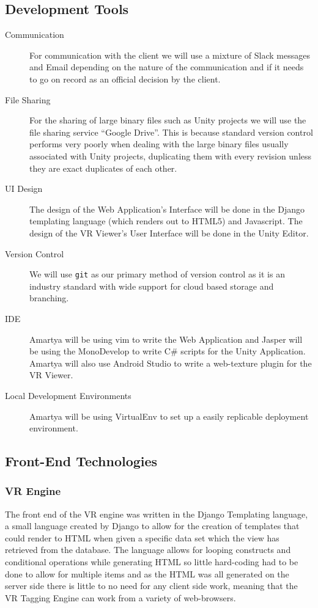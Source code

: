 \documentclass[12pt]{report}
\newcommand{\inlinecode}{\texttt}
\begin{document}
\subsection{Development Tools}
\begin{description}
 \item[Communication] For communication with the client we will use a mixture of Slack messages and Email depending on the nature of the communication and if it needs to go on record as an official decision by the client. 
 \item[File Sharing] For the sharing of large binary files such as Unity projects we will use the file sharing service ``Google Drive''. This is because standard version control performs very poorly when dealing with the large binary files usually associated with Unity projects, duplicating them with every revision unless they are exact duplicates of each other.

 \item[UI Design] The design of the Web Application's Interface will be done in the Django templating language (which renders out to HTML5) and Javascript. The design of the VR Viewer's User Interface will be done in the Unity Editor.

 \item[Version Control] We will use \inlinecode{git} as our primary method of version control as it is an industry standard with wide support for cloud based storage and branching.

 \item[IDE] Amartya will be using vim to write the Web Application and Jasper will be using the MonoDevelop to write C\# scripts for the Unity Application. Amartya will also use Android Studio to write a web-texture plugin for the VR Viewer.

 \item[Local Development Environments] Amartya will be using VirtualEnv to set up a easily replicable deployment environment.
\end{description}

\subsection{Front-End Technologies}
\subsubsection{VR Engine}
The front end of the VR engine was written in the Django Templating language, a small language created by Django to allow for the creation of templates that could render to HTML when given a specific data set which the view has retrieved from the database. The language allows for looping constructs and conditional operations while generating HTML so little hard-coding had to be done to allow for multiple items and as the HTML was all generated on the server side there is little to no need for any client side work, meaning that the VR Tagging Engine can work from a variety of web-browsers. 
\end{document}
